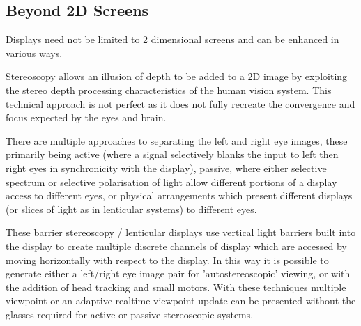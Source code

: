 \subsection{Beyond 2D Screens}
            Displays need not be limited to 2 dimensional screens and can be enhanced in various ways.\par
                Stereoscopy allows an illusion of depth to be added to a 2D image by exploiting the stereo depth processing characteristics of the human vision system. This technical approach is not perfect as it does not fully recreate the convergence and focus expected by the eyes and brain.\par %
                There are multiple approaches to separating the left and right eye images, these primarily being active (where a signal selectively blanks the input to left then right eyes in synchronicity with the display), passive, where either selective spectrum or selective polarisation of light allow different portions of a display access to different eyes, or physical arrangements which present different displays (or slices of light as in lenticular systems) to different eyes.\par
                These barrier stereoscopy / lenticular displays use vertical light barriers built into the display to create multiple discrete channels of display which are accessed by moving horizontally with respect to the display. In this way it is possible to generate either a left/right eye image pair for 'autostereoscopic' viewing, or with the addition of head tracking and small motors. With these techniques multiple viewpoint or an adaptive realtime viewpoint update can be presented without the glasses required for active or passive stereoscopic systems. \par
